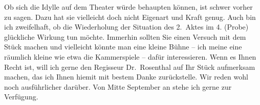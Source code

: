 \pstart
           Ob sich die Idylle auf dem Theater würde behaupten können, ist schwer vorher zu
               sagen. Dazu hat sie vielleicht doch nicht Eigenart und Kraft genug. Auch bin ich
               zweifelhaft, ob die Wiederholung der Situation des 2. Aktes im 4. (Probe) glückliche
               Wirkung tun möchte. Immerhin sollten Sie einen Versuch mit dem {\pb}Stück machen und vielleicht
               könnte man eine kleine Bühne – ich meine eine räumlich kleine wie etwa die Kammerspiele – dafür interessieren. Wenn es Ihnen
               Recht ist, will ich gerne den Regisseur Dr. Rosenthal auf Ihr Stück aufmerksam machen, das ich Ihnen hiemit mit bestem Danke zurückstelle.
               Wir reden wohl noch ausführlicher darüber. Von Mitte September an stehe
               ich gerne zur Verfügung.\pend
           
